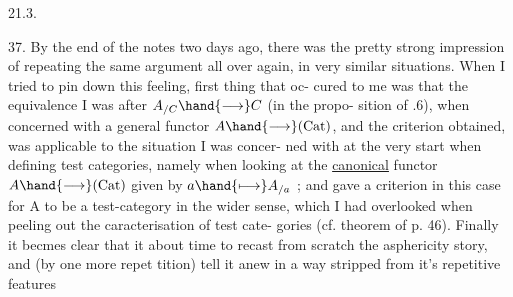 21.3.

37. By the end of the notes two days ago, there was the pretty strong
impression of repeating the same argument all over again, in very similar
situations. When I tried to pin down this feeling, first thing that oc-%
cured to me was that the  equivalence I was after $A_{/C} \hand{\longrightarrow} C$ (in the propo-%
sition of .6), when concerned with a general functor $A \hand{\longrightarrow} (\mathrm{Cat})$,
and the criterion obtained, was applicable to the situation I was concer-%
ned with at the very start when defining test categories, namely when
looking at the \uline{canonical} functor $A \hand{\longrightarrow} (\mathrm{Cat})$ given by $a \hand{\longmapsto} A_{/a}$ ; and  gave
a criterion in this case for A to be a test-category in the wider sense,
which I had overlooked when peeling out the caracterisation of test cate-%
gories (cf. theorem of p. 46). Finally it becmes clear that it  about
time to recast from scratch the asphericity story, and (by one more repet%
tition) tell it anew in a way stripped from it's repetitive features
